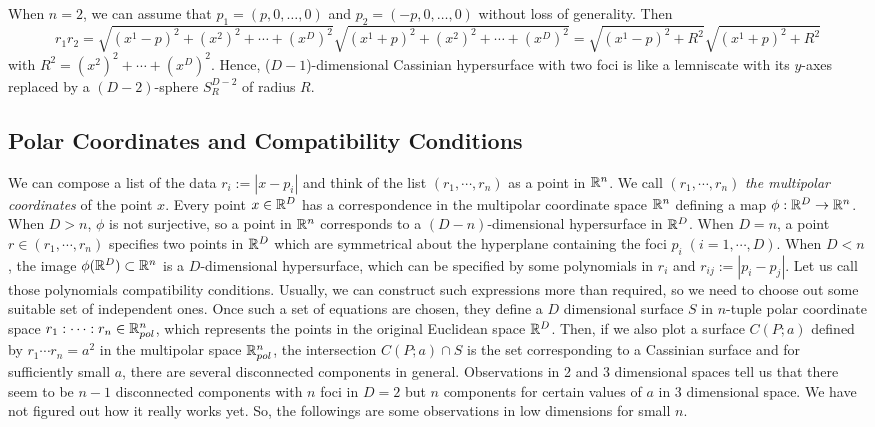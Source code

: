\documentclass{article}
\begin{document}
When $n=2$, we can assume that $p_1 = (p,0,\dots,0)$ and $p_2 = (-p,0,\dots,0)$ without loss of generality. Then
\begin{equation}
\label{ }
r_1r_2 = \sqrt{(x^1-p)^2 + (x^2)^2 + \cdots + (x^D)^2}\sqrt{(x^1+p)^2 + (x^2)^2 + \cdots + (x^D)^2} = \sqrt{(x^1-p)^2 + R^2}\sqrt{(x^1+p)^2 + R^2}
\end{equation}
with $R^2 = (x^2)^2 + \cdots + (x^D)^2$. Hence, ($D-1$)-dimensional Cassinian hypersurface with two foci is like a lemniscate with its $y$-axes replaced by a $(D-2)$-sphere $S_R^{D-2}$ of radius $R$.

\subsection{Polar Coordinates and Compatibility Conditions}
\label{sec-1-3}
We can compose a list of the data $r_i := |x-p_i|$ and think of the list $(r_1,\cdots,r_n)$ as a point in $\mathbb R^n$. 
We call $(r_1,\cdots,r_n)$ \emph{the multipolar coordinates} of the point $x$. 
Every point $x \in \mathbb R^D$ has a correspondence in the multipolar coordinate space $\mathbb R^n$ defining a map $\phi:\mathbb R^D \rightarrow \mathbb R^n$. 
When $D>n$, $\phi$ is not surjective, so a point in $\mathbb R^n$ corresponds to a $(D-n)$-dimensional hypersurface in $\mathbb R^{D}$. 
When $D=n$, a point $r \in (r_1, \cdots,r_n)$ specifies two points in $\mathbb R^D$ which are symmetrical about the hyperplane containing the foci $p_i \;(i=1,\cdots,D)$. 
When $D<n$, the image $\phi(\mathbb R^D) \subset \mathbb R^n$ is a $D$-dimensional hypersurface, which can be specified by some polynomials in $r_i$ and $r_{ij}:=|p_{i}-p_{j}|$. 
Let us call those polynomials compatibility conditions. Usually, we can construct such expressions more than required, so we need to choose out some suitable set of independent ones. 
Once such a set of equations are chosen, they define a $D$ dimensional surface $S$ in $n$-tuple polar coordinate space $r_1:\cdots:r_n \in \mathbb R_{pol}^n$, which represents the points in the original Euclidean space $\mathbb R^D$. 
Then, if we also plot a surface $C(P;a)$ defined by $r_1\cdots r_n = a^2$ in the multipolar space $\mathbb R_{pol}^n$, the intersection $C(P;a) \cap S$ is the set corresponding to a Cassinian surface and for sufficiently small $a$, there are several disconnected components in general. 
Observations in 2 and 3 dimensional spaces tell us that there seem to be $n-1$ disconnected components with $n$ foci in $D=2$ but $n$ components for certain values of $a$ in 3 dimensional space. 
We have not figured out how it really works yet. So, the followings are some observations in low dimensions for small $n$.
\end{document}
